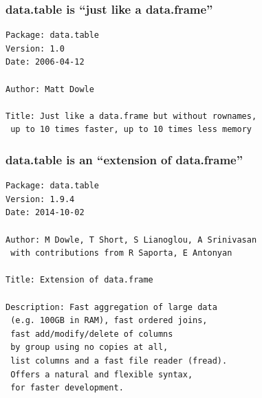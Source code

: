 \documentclass{beamer}
\begin{document}
\begin{frame}[fragile]
  \frametitle{data.table is ``just like a data.frame''}

\begin{verbatim}
Package: data.table
Version: 1.0
Date: 2006-04-12

Author: Matt Dowle

Title: Just like a data.frame but without rownames, 
 up to 10 times faster, up to 10 times less memory

\end{verbatim}



\end{frame}

\begin{frame}[fragile]
  \frametitle{data.table is an ``extension of data.frame''}

\begin{verbatim}
Package: data.table
Version: 1.9.4
Date: 2014-10-02

Author: M Dowle, T Short, S Lianoglou, A Srinivasan 
 with contributions from R Saporta, E Antonyan

Title: Extension of data.frame

Description: Fast aggregation of large data
 (e.g. 100GB in RAM), fast ordered joins, 
 fast add/modify/delete of columns 
 by group using no copies at all, 
 list columns and a fast file reader (fread). 
 Offers a natural and flexible syntax, 
 for faster development.
\end{verbatim}

\end{frame}

  
\end{document}
